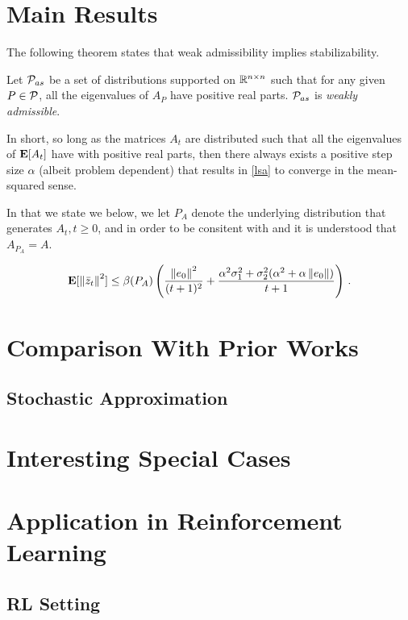 \documentclass{article}
\begin{document}
\section{Main Results}
The following theorem states that weak admissibility implies stabilizability.
\begin{theorem}
Let $\P_{as}$ be a set of distributions supported on $\R^{\ncn}$ such that for any given $P\in \P$, all the eigenvalues of $A_{P}$ have positive real parts. $\P_{as}$ is \emph{weakly admissible}.
\end{theorem}
In short, so long as the matrices $A_t$ are distributed such that all the eigenvalues of $\E[A_t]$ have with positive real parts, then there always exists a positive step size $\alpha$ (albeit problem dependent) that results in \eqref{lsa} to converge in the mean-squared sense.

In  that we state we below, we let $P_A$ denote the underlying distribution that generates $A_t, t\geq 0$, and in order to be consitent with  and  it is understood that $A_{P_A}=A$.
\begin{theorem}\label{thm:rate}
\begin{align}
\E[\norm{\zb_t}^2]
\leq \beta(P_A)
\left(\frac{\norm{e_0}^2}{(t+1)^2}+ \frac{\alpha^2{\sigma}_1^2+ {\sigma}_2^2 (\alpha^2+\alpha \norm{e_0})}{t+1} \right)\,.
\end{align}

\end{theorem}

\section{Comparison With Prior Works}

\subsection{Stochastic Approximation}

\section{Interesting Special Cases}

\section{Application in Reinforcement Learning}
\subsection{RL Setting}
\end{document}
